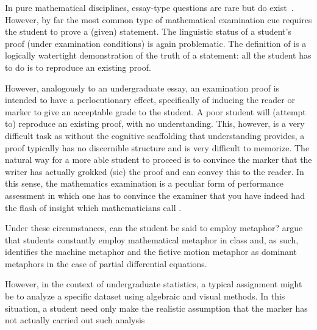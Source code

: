 In pure mathematical disciplines, essay-type questions are rare but do
exist~\citep{johnson1983}.  However, by far the most common type of
mathematical examination cue requires the student to prove a (given)
statement.  The linguistic status of a student's proof (under
examination conditions) is again problematic.  The definition of
 is a logically watertight demonstration of the truth of
a statement: all the student has to do is to reproduce an existing
proof.

However, analogously to an undergraduate essay, an examination proof
is intended to have a perlocutionary effect, specifically of inducing
the reader or marker to give an acceptable grade to the student.  A
poor student will (attempt to) reproduce an existing proof, with no
understanding.  This, however, is a very difficult task as without the
cognitive scaffolding that understanding provides, a proof typically
has no discernible structure and is very difficult to memorize.  The
natural way for a more able student to proceed is to convince the
marker that the writer has actually grokked (sic) the proof and can
convey this to the reader.  In this sense, the mathematics examination
is a peculiar form of performance assessment in which one has to
convince the examiner that you have indeed had the flash of insight
which mathematicians call .

Under these circumstances, can the student be said to employ metaphor?
 argue that students constantly employ mathematical
metaphor in class and, as such, identifies the machine metaphor and
the fictive motion metaphor as dominant metaphors in the case of
partial differential equations.

However, in the context of undergraduate statistics, a typical
assignment might be to analyze a specific dataset using algebraic and
visual methods.  In this situation, a student need only make the
realistic assumption that the marker has not actually carried out such
analysis~\citep{horowitz1986}



